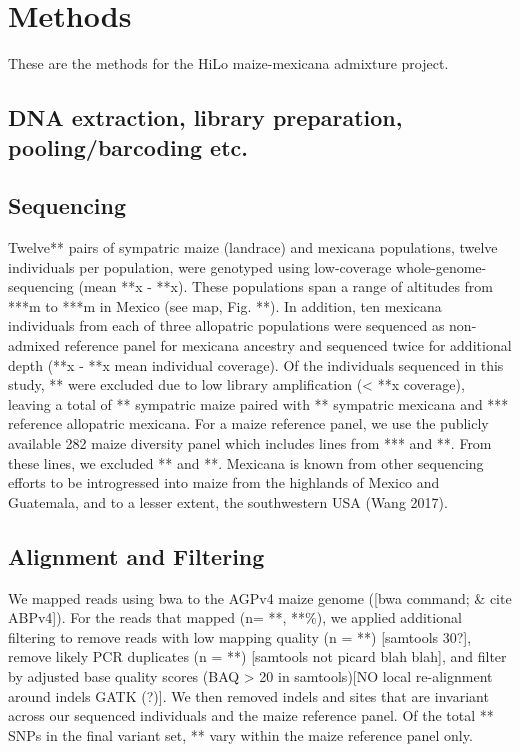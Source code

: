\documentclass[12pt]{report}
\begin{document}
\section{Methods}
These are the methods for the HiLo maize-mexicana admixture project.

\subsection{DNA extraction, library preparation, pooling/barcoding etc.}
\subsection{Sequencing}
Twelve** pairs of sympatric maize (landrace) and mexicana populations, twelve individuals per population, were genotyped using low-coverage whole-genome-sequencing (mean **x - **x). These populations span a range of altitudes from ***m to ***m in Mexico (see map, Fig. **). In addition, ten mexicana individuals from each of three allopatric populations were sequenced as non-admixed reference panel for mexicana ancestry and sequenced twice for additional depth (**x - **x mean individual coverage). Of the individuals sequenced in this study, ** were excluded due to low library amplification (< **x coverage), leaving a total of ** sympatric maize paired with ** sympatric mexicana and *** reference allopatric mexicana. For a maize reference panel, we use the publicly available 282 maize diversity panel which includes lines from *** and **. From these lines, we excluded ** and **. Mexicana is known from other sequencing efforts to be introgressed into maize from the highlands of Mexico and Guatemala, and to a lesser extent, the southwestern USA (Wang 2017). \par
\subsection{Alignment and Filtering}
We mapped reads using bwa to the AGPv4 maize genome ([bwa command; \& cite ABPv4]). For the reads that mapped (n= **, **\%), we applied additional filtering to remove reads with low mapping quality (n = **) [samtools 30?], remove likely PCR duplicates (n = **) [samtools not picard blah blah], and filter by adjusted base quality scores (BAQ > 20 in samtools)[NO local re-alignment around indels GATK (?)]. We then removed indels and sites that are invariant across our sequenced individuals and the maize reference panel. Of the total ** SNPs in the final variant set, ** vary within the maize reference panel only.
\end{document}
